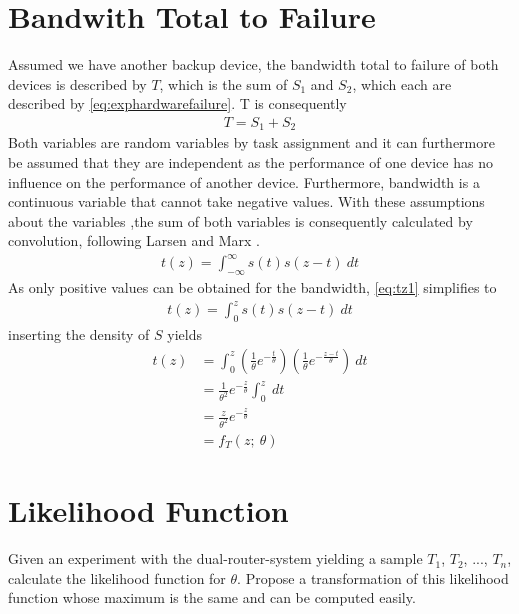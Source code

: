 \section{Bandwith Total to Failure}
Assumed we have another backup device, the bandwidth total to failure of both devices is described by $T$, which is the sum of $S_1$ and $S_2$, which each are described by \eqref{eq:exphardwarefailure}. T is consequently
\begin{equation}
\begin{split}
T = S_1 + S_2
\end{split}
\label{eq:T}
\end{equation}
Both variables are random variables by task assignment and it can furthermore be assumed that they are independent as the performance of one device has no influence on the performance of another device. Furthermore, bandwidth is a continuous variable that cannot take negative values. With these assumptions about the variables ,the sum of both variables is consequently calculated by convolution, following Larsen and Marx \cite[Theorem~3.8.3]{larsen2005introduction}.
\begin{equation}
\begin{split}
t(z) = \int_{-\infty}^\infty s(t)s(z-t)~dt
\end{split}
\label{eq:tz1}
\end{equation}
As only positive values can be obtained for the bandwidth, \eqref{eq:tz1} simplifies to 
\begin{equation}
\begin{split}
t(z) = \int_{0}^zs(t)s(z-t)~dt
\end{split}
\label{eq:tz2}
\end{equation}
inserting the density of $S$ yields
\begin{equation}
\begin{split}
t(z) 
&= \int_{0}^z \left(\frac{1}{\theta} e^{-\frac{t}{\theta}}\right)
\left(\frac{1}{\theta} e^{-\frac{z-t}{\theta}}\right)~dt\\
&= \frac{1}{\theta^2} e^{-\frac{z}{\theta}}\int_{0}^z~dt\\
&= \frac{z}{\theta^2} e^{-\frac{z}{\theta}}\\
&= f_T(z;~\theta)
\end{split}
\label{eq:tz3}
\end{equation}

\section{Likelihood Function}
Given an experiment with the dual-router-system yielding a sample $T_1$, $T_2$, ..., $T_n$, calculate the likelihood function for $\theta$. Propose a transformation of this likelihood function whose maximum is the same and can be computed easily.

